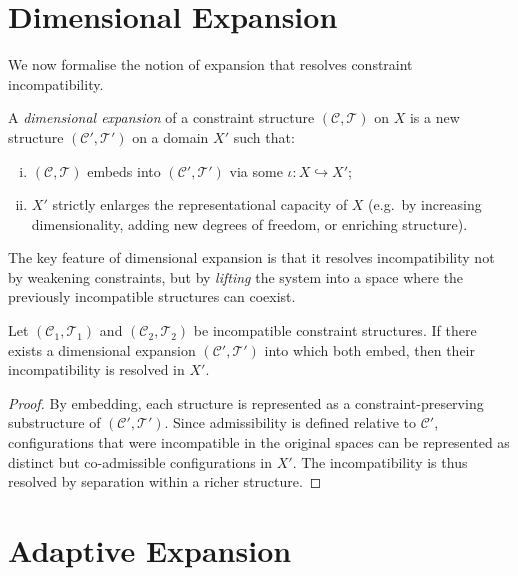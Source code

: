 \documentclass[11pt,openany]{book}
\begin{document}
\section{Dimensional Expansion}
\label{sec:dimensional-expansion}

We now formalise the notion of expansion that resolves
constraint incompatibility.

\begin{definition}
\label{def:dimensional-expansion}
A \emph{dimensional expansion} of a constraint structure
$(\mathcal{C}, \mathcal{T})$ on $X$ is a new structure
$(\mathcal{C}', \mathcal{T}')$ on a domain $X'$ such that:
\begin{enumerate}[(i)]
\item $(\mathcal{C}, \mathcal{T})$ embeds into
$(\mathcal{C}', \mathcal{T}')$ via some
$\iota : X \hookrightarrow X'$;
\item $X'$ strictly enlarges the representational capacity
of $X$ (e.g.\ by increasing dimensionality, adding new
degrees of freedom, or enriching structure).
\end{enumerate}
\end{definition}

The key feature of dimensional expansion is that it resolves
incompatibility not by weakening constraints, but by
\emph{lifting} the system into a space where the previously
incompatible structures can coexist.

\begin{proposition}
\label{prop:resolution-expansion}
Let $(\mathcal{C}_1, \mathcal{T}_1)$ and
$(\mathcal{C}_2, \mathcal{T}_2)$ be incompatible constraint
structures. If there exists a dimensional expansion
$(\mathcal{C}', \mathcal{T}')$ into which both embed, then
their incompatibility is resolved in $X'$.
\end{proposition}

\begin{proof}
By embedding, each structure is represented as a
constraint-preserving substructure of $(\mathcal{C}',
\mathcal{T}')$. Since admissibility is defined relative to
$\mathcal{C}'$, configurations that were incompatible in the
original spaces can be represented as distinct but
co-admissible configurations in $X'$. The incompatibility is
thus resolved by separation within a richer structure.
\end{proof}

\section{Adaptive Expansion}
\label{sec:adaptive-expansion}
\end{document}
